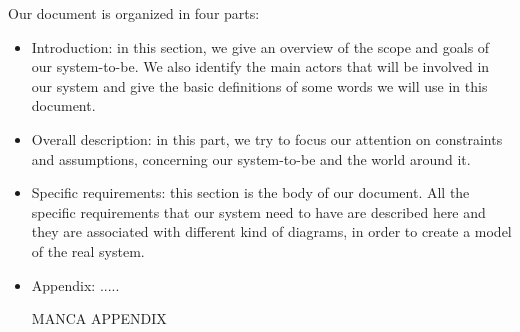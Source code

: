 Our document is organized in four parts:
\begin{itemize}
	\item Introduction: in this section, we give an overview of the scope and goals of our system-to-be. We also identify the main actors that will be involved in our system and give the basic definitions of some words we will use in this document.
	\item Overall description: in this part, we try to focus our attention on constraints and assumptions, concerning our system-to-be and the world around it. 
	\item Specific requirements: this section is the body of our document. All the specific requirements that our system need to have are described here and they are associated with different kind of diagrams, in order to create a model of the real system.
	\item Appendix: .....
	
	MANCA APPENDIX
	
\end{itemize}